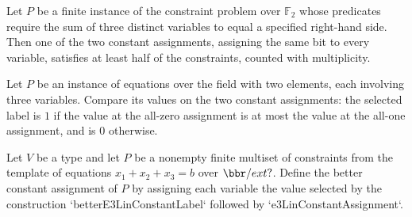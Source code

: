 \begin{theorem}
\label{FABL.exists_constantAssignment_value_ge_half_e3Lin}
\leanok
{}
Let $P$ be a finite instance of the constraint problem over $\mathbb F_2$ whose
predicates require the sum of three distinct variables to equal a specified right-hand
side. Then one of the two constant assignments, assigning the same bit to every
variable, satisfies at least half of the constraints, counted with multiplicity.
\end{theorem}

\begin{definition}
\label{FABL.betterE3LinConstantLabel}
\leanok
{}
Let $P$ be an instance of equations over the field with two elements, each involving
three variables. Compare its values on the two constant assignments: the selected label
is $1$ if the value at the all-zero assignment is at most the value at the all-one
assignment, and is $0$ otherwise.
\end{definition}

\begin{definition}
\label{FABL.betterE3LinConstantAssignment}
\leanok
{}
Let $V$ be a type and let $P$ be a nonempty finite multiset of constraints from the
template of equations $x_1+x_2+x_3=b$ over $\bbr/	ext{?}$. Define the better constant
assignment of $P$ by assigning each variable the value selected by the construction
`betterE3LinConstantLabel` followed by `e3LinConstantAssignment`.
\end{definition}

